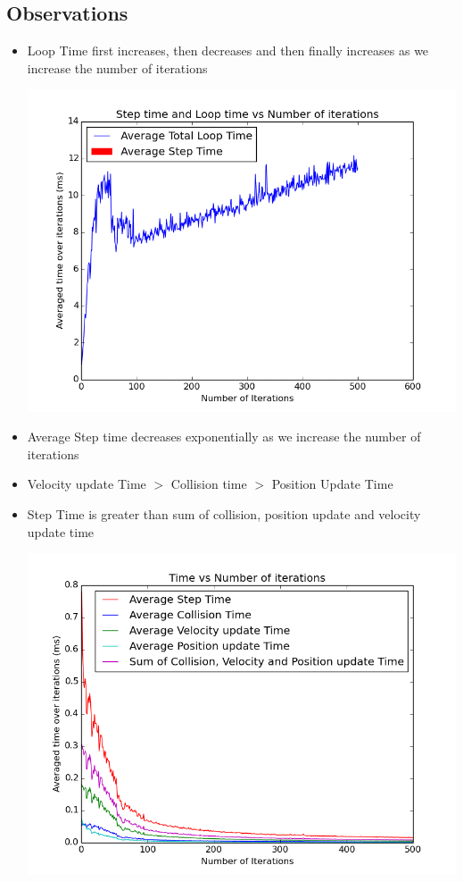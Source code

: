 \documentclass[11pt]{article}
\begin{document}
\subsection{Observations}
\begin{itemize}
\item Loop Time first increases, then decreases and then finally increases as we increase the number of iterations
\begin{center}
\includegraphics[scale=0.45]{./images/g13_plot01}
\end{center}
\item Average Step time decreases exponentially as we increase the number of iterations 
\item Velocity update Time $>$ Collision time $>$ Position Update Time
\item Step Time is greater than sum of collision, position update and velocity update time
\begin{center}
\includegraphics[scale=0.45]{./images/g13_plot02}

\end{center}
\end{itemize}
\end{document}
